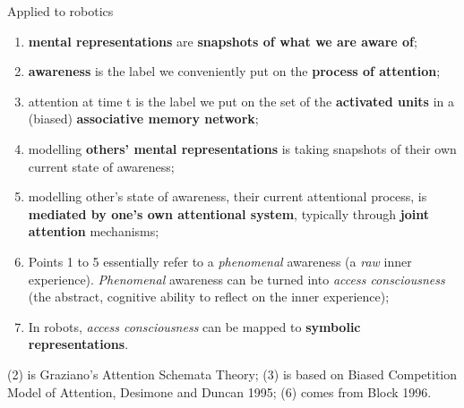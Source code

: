 \documentclass[compress]{beamer}
\begin{document}
\begin{frame}{Applied to robotics}

    \begin{enumerate}
        \item<+-> {\bf mental representations} are {\bf snapshots of what we are
            aware of};
        \item<+-> {\bf awareness} is the label we conveniently put on the {\bf
            process of attention};
        \item<+-> attention at time t is the label we put on the set of the {\bf
            activated units} in
            a (biased) {\bf associative memory network};
        \item<+-> modelling {\bf others’ mental representations} is taking snapshots of their own
current state of awareness;

\item<+-> modelling other’s state of awareness, \ie their current attentional process,
    is {\bf mediated by one’s own attentional system}, typically through {\bf
            joint attention}
mechanisms;

\item<+-> Points 1 to 5 essentially refer to a \emph{phenomenal} awareness (a
    \emph{raw} inner experience). \emph{Phenomenal} awareness can be turned into
            \emph{access consciousness} (the abstract, cognitive ability to reflect on the inner experience);

        \item<+-> In robots, \emph{access consciousness} can be mapped to {\bf
            symbolic representations}.
    \end{enumerate}

(2) is Graziano's Attention Schemata Theory; (3) is based on Biased Competition
Model of Attention, Desimone and Duncan 1995; (6) comes from Block 1996.


\end{frame}
\end{document}
